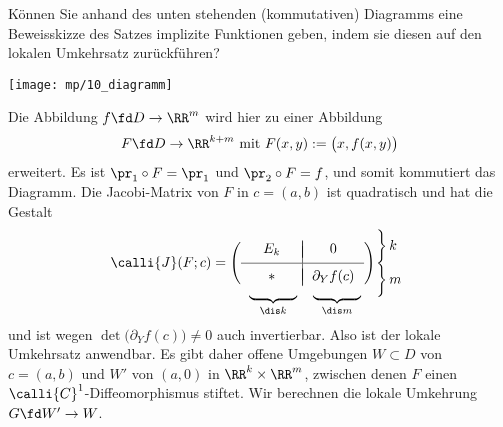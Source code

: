 \begin{frage}
  Können Sie anhand des unten stehenden 
  (kommutativen) Diagramms eine Beweisskizze 
  des Satzes implizite Funktionen geben, indem sie diesen auf 
  den lokalen Umkehrsatz zurückführen?
  \begin{center}
    \texttt{[image: mp/10\_diagramm]}
  \end{center}
\end{frage}

\begin{antwort}
  Die Abbildung $f\fd D\to \RR^m$ wird hier zu einer 
  Abbildung 
  \[
  F\fd D\to \RR^{k+m} \text{ mit } F(x,y):=\big( x, f(x,y) \big)
  \]
  erweitert. Es ist $\pr_1 \circ F = \pr_1$ und $\pr_2 \circ F = f$, und somit 
  kommutiert das Diagramm.  
  Die Jacobi-Matrix von $F$ in $c=(a,b)$ ist quadratisch und hat die 
  Gestalt 
  \begin{align*}
    \calli{J}( F;c ) &=   \left(
      \begin{array}{c|c}  
        \rule{12mm}{0mm} & \rule{12mm}{0mm} \\[-4mm] 
        E_k & 0 \\[-3mm] \\ \hline  & \\[-3mm]
        \ast & \partial_Y f(c)  \\[-4mm] & \end{array} \right) 
    \hspace*{-2mm}
    \begin{array}{l} 
      \bigg\rbrace \, k \\[1mm]
      \bigg\rbrace \, m 
    \end{array} \\[-5mm]
    & 
    \hspace*{9mm} \underbrace{\rule{12mm}{0mm}}_{\dis k} \quad 
    \underbrace{\rule{12mm}{0mm}}_{\dis m}  
  \end{align*}
  und ist wegen $\det \big( \partial_Y f(c) \big) \not=0$ auch invertierbar. 
  Also ist der lokale Umkehrsatz anwendbar. Es gibt daher offene Umgebungen 
  $W\subset D$ von $c=(a,b)$ und $W'$ von $(a,0)$ in $\RR^k\times \RR^m$, 
  zwischen denen $F$ einen $\calli{C}^1$-Diffeomorphismus stiftet. Wir berechnen 
  die lokale Umkehrung $G\fd W' \to W$.  


\end{antwort}
